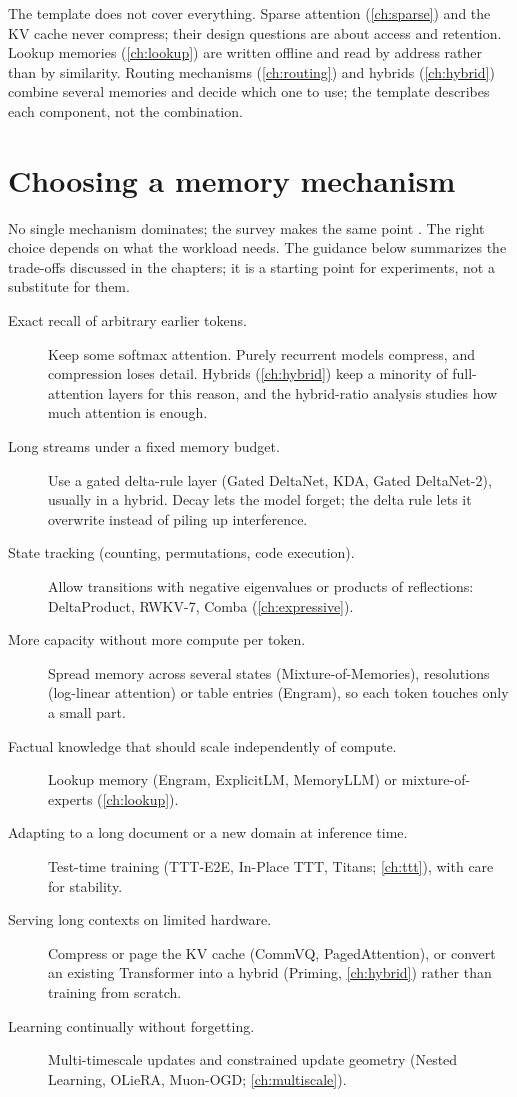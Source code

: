 The template does not cover everything. Sparse attention (\cref{ch:sparse}) and the KV cache
never compress; their design questions are about access and retention. Lookup memories
(\cref{ch:lookup}) are written offline and read by address rather than by similarity.
Routing mechanisms (\cref{ch:routing}) and hybrids (\cref{ch:hybrid}) combine several memories
and decide which one to use; the template describes each component, not the combination.

\section{Choosing a memory mechanism}\label{sec:c14-choosing}

No single mechanism dominates; the survey makes the same point \citep{zhoubian2026memory}.
The right choice depends on what the workload needs. The guidance below summarizes the
trade-offs discussed in the chapters; it is a starting point for experiments, not a
substitute for them.

\begin{description}
  \item[Exact recall of arbitrary earlier tokens.] Keep some softmax attention. Purely
    recurrent models compress, and compression loses detail. Hybrids
    (\cref{ch:hybrid}) keep a minority of full-attention layers for this reason, and the
    hybrid-ratio analysis \citep{wang2025hybridanalysis} studies how much attention is
    enough.
  \item[Long streams under a fixed memory budget.] Use a gated delta-rule layer
    (Gated DeltaNet, KDA, Gated DeltaNet-2), usually in a hybrid. Decay lets the model forget;
    the delta rule lets it overwrite instead of piling up interference.
  \item[State tracking (counting, permutations, code execution).] Allow transitions with
    negative eigenvalues or products of reflections: DeltaProduct, RWKV-7, Comba
    (\cref{ch:expressive}).
  \item[More capacity without more compute per token.] Spread memory across several states
    (Mixture-of-Memories), resolutions (log-linear attention) or table entries (Engram), so
    each token touches only a small part.
  \item[Factual knowledge that should scale independently of compute.] Lookup memory
    (Engram, ExplicitLM, MemoryLLM) or mixture-of-experts (\cref{ch:lookup}).
  \item[Adapting to a long document or a new domain at inference time.] Test-time training
    (TTT-E2E, In-Place TTT, Titans; \cref{ch:ttt}), with care for stability.
  \item[Serving long contexts on limited hardware.] Compress or page the KV cache (CommVQ,
    PagedAttention), or convert an existing Transformer into a hybrid (Priming,
    \cref{ch:hybrid}) rather than training from scratch.
  \item[Learning continually without forgetting.] Multi-timescale updates and constrained
    update geometry (Nested Learning, OLieRA, Muon-OGD; \cref{ch:multiscale}).
\end{description}

